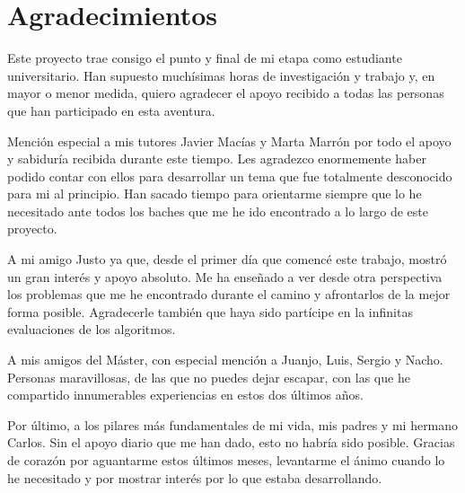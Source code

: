 
\chapter*{Agradecimientos}
\label{cha:agradecimientos}

Este proyecto trae consigo el punto y final de mi etapa como estudiante universitario. Han supuesto muchísimas horas de investigación y trabajo y, en mayor o menor medida, quiero agradecer el apoyo recibido a todas las personas que han participado en esta aventura.

Mención especial a mis tutores Javier Macías y Marta Marrón por todo el apoyo y sabiduría recibida durante este tiempo. Les agradezco enormemente haber podido contar con ellos para desarrollar un tema que fue totalmente desconocido para mi al principio. Han sacado tiempo para orientarme siempre que lo he necesitado ante todos los baches que me he ido encontrado a lo largo de este proyecto.

A mi amigo Justo ya que, desde el primer día que comencé este trabajo, mostró un gran interés y apoyo absoluto. Me ha enseñado a ver desde otra perspectiva los problemas que me he encontrado durante el camino y afrontarlos de la mejor forma posible. Agradecerle también que haya sido partícipe en la infinitas evaluaciones de los algoritmos.

A mis amigos del Máster, con especial mención a Juanjo, Luis, Sergio y Nacho. Personas maravillosas, de las que no puedes dejar escapar, con las que he compartido innumerables experiencias en estos dos últimos años.

Por último, a los pilares más fundamentales de mi vida, mis padres y mi hermano Carlos. Sin el apoyo diario que me han dado, esto no habría sido posible. Gracias de corazón por aguantarme estos últimos meses, levantarme el ánimo cuando lo he necesitado y por mostrar interés por lo que estaba desarrollando. 